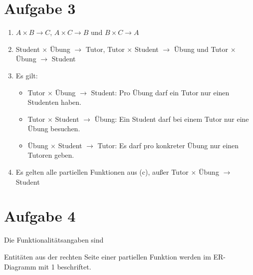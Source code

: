 \documentclass{article}
\begin{document}
	\section*{Aufgabe 3}
	\begin{enumerate}[label=(\alph*)]
		\item $A\times B\to C$, $A\times C\to B$ und $B\times C\to A$
		\item Student $\times$ Übung $\to$ Tutor, Tutor $\times$ Student $\to$ Übung und Tutor $\times$ Übung $\to$ Student
		\item Es gilt:
		\begin{itemize}
			\item Tutor $\times$ Übung $\to$ Student: Pro Übung darf ein Tutor nur einen Studenten haben.
			\item Tutor $\times$ Student $\to$ Übung: Ein Student darf bei einem Tutor nur eine Übung besuchen.
			\item Übung $\times$ Student $\to$ Tutor: Es darf pro konkreter Übung nur einen Tutoren geben.
		\end{itemize}
		\item Es gelten alle partiellen Funktionen aus (c), außer Tutor $\times$ Übung $\to$ Student
	\end{enumerate}
	
	\section*{Aufgabe 4}
	Die Funktionalitätsangaben sind
	\begin{center}
	\end{center}
	Entitäten aus der rechten Seite einer partiellen Funktion werden im ER-Diagramm mit 1 beschriftet.
	
\end{document}
